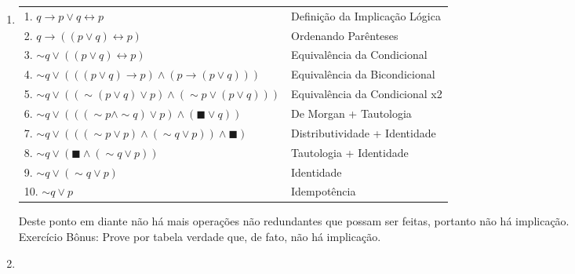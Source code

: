 \documentclass[12pt, a4paper,final]{article}
\begin{document}
\begin{enumerate}
\begin{enumerate}[label=(\alph*)]
            \item 
            
                \begin{tabular}{ll}
                    1. $q \rightarrow p \vee q \leftrightarrow p$ & Definição da Implicação Lógica \\ 
                    2. $q \rightarrow ((p \vee q) \leftrightarrow p)$ & Ordenando Parênteses \\
                    3. $\sim q \vee ((p \vee q) \leftrightarrow p)$ & Equivalência da Condicional \\
                    4. $\sim q \vee (((p \vee q)\rightarrow p) \wedge (p \rightarrow (p \vee q)))$ & Equivalência da Bicondicional \\
                    5. $\sim q \vee ((\sim(p \vee q) \vee p) \wedge (\sim p \vee (p \vee q)))$ & Equivalência da Condicional x2 \\
                    6. $\sim q \vee (((\sim p \wedge \sim q) \vee p) \wedge (\blacksquare \vee q))$ & De Morgan + Tautologia \\
                    7. $\sim q \vee (((\sim p \vee p) \wedge (\sim q \vee p)) \wedge \blacksquare)$ & Distributividade + Identidade \\ 
                    8. $\sim q \vee (\blacksquare \wedge (\sim q \vee p))$ & Tautologia + Identidade \\
                    9. $\sim q \vee (\sim q \vee p)$ & Identidade \\
                    10. $\sim q \vee p$ & Idempotência \\
                \end{tabular}
            
            \vskip 5mm
            
            Deste ponto em diante não há mais operações não redundantes que possam ser feitas, portanto não há implicação.\\
            Exercício Bônus: Prove por tabela verdade que, de fato, não há implicação.
            
            \vskip 5mm
            
            \item 
            
            

\end{enumerate}
\end{enumerate}
\end{document}
